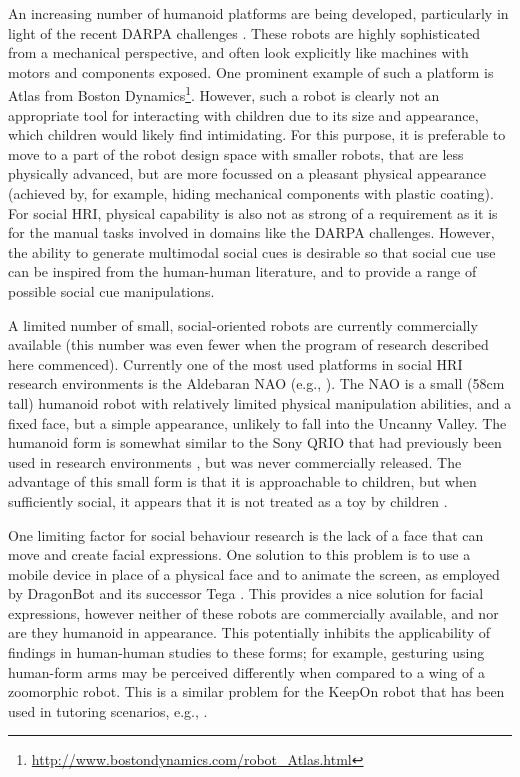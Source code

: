 An increasing number of humanoid platforms are being developed, particularly in light of the recent DARPA challenges \citep{destephe2015walking}. These robots are highly sophisticated from a mechanical perspective, and often look explicitly like machines with motors and components exposed. One prominent example of such a platform is Atlas from Boston Dynamics\footnote{\url{http://www.bostondynamics.com/robot\_Atlas.html}}. However, such a robot is clearly not an appropriate tool for interacting with children due to its size and appearance, which children would likely find intimidating. For this purpose, it is preferable to move to a part of the robot design space with smaller robots, that are less physically advanced, but are more focussed on a pleasant physical appearance (achieved by, for example, hiding mechanical components with plastic coating). For social HRI, physical capability is also not as strong of a requirement as it is for the manual tasks involved in domains like the DARPA challenges. However, the ability to generate multimodal social cues is desirable so that social cue use can be inspired from the human-human literature, and to provide a range of possible social cue manipulations.

A limited number of small, social-oriented robots are currently commercially available (this number was even fewer when the program of research described here commenced). Currently one of the most used platforms in social HRI research environments is the Aldebaran NAO (e.g., \citealt{ramachandran2016shaping,tanaka2007socialization,zaga2015effect}). The NAO is a small (58cm tall) humanoid robot with relatively limited physical manipulation abilities, and a fixed face, but a simple appearance, unlikely to fall into the Uncanny Valley. The humanoid form is somewhat similar to the Sony QRIO that had previously been used in research environments \citep{tanaka2012children}, but was never commercially released. The advantage of this small form is that it is approachable to children, but when sufficiently social, it appears that it is not treated as a toy by children \citep{tanaka2007socialization}.

One limiting factor for social behaviour research is the lack of a face that can move and create facial expressions. One solution to this problem is to use a mobile device in place of a physical face and to animate the screen, as employed by DragonBot \citep{setapen2012creating} and its successor Tega \citep{park2017telling}. This provides a nice solution for facial expressions, however neither of these robots are commercially available, and nor are they humanoid in appearance. This potentially inhibits the applicability of findings in human-human studies to these forms; for example, gesturing using human-form arms may be perceived differently when compared to a wing of a zoomorphic robot. This is a similar problem for the KeepOn robot that has been used in tutoring scenarios, e.g., \cite{leyzberg2012physical}.

